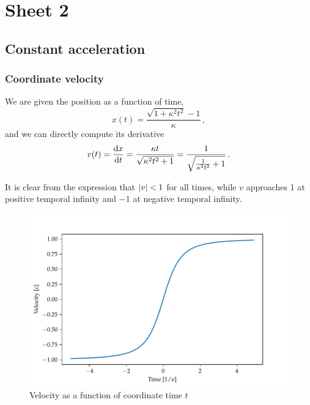 \documentclass[main.tex]{subfiles}
\begin{document}
\section{Sheet 2}

\subsection{Constant acceleration}

\subsubsection{Coordinate velocity}

We are given the position as a function of time, 
\begin{equation} \label{eq:constant-acceleration} 
  x(t) = \frac{\sqrt{1 + \kappa^2 t^2} -1 }{\kappa }\,,
\end{equation}
%
and we can directly compute its derivative
%
\begin{equation} \label{eq:constant-acceleration-velocity} 
  v(t) = \dv{x}{t} =
  \frac{\kappa t}{\sqrt{\kappa^2 t^2  + 1} }=\frac{1}{\sqrt{\frac{1}{\kappa^2 t^2}+1 }}\,.
\end{equation}

It is clear from the expression that \(\abs{v} < 1\) for all times, while \(v\) approaches 1 at positive temporal infinity and \(-1\) at negative temporal infinity.

\begin{figure}[h]
    \centering
    \includegraphics[width=\textwidth]{figures/velocity.pdf}
    \caption{Velocity as a function of coordinate time \(t\)}
    \label{fig:velocity-constant-acceleration}
\end{figure}
\end{document}
